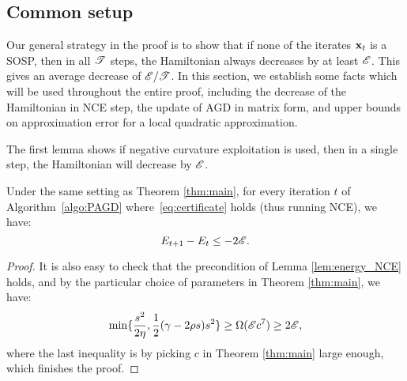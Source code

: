 





\subsection{Common setup}
Our general strategy in the proof is to show that if none of the iterates $\mathbf{x}_t$ is a SOSP, then in all $\mathscr{T}$ steps, the Hamiltonian always decreases by at least $\mathscr{E}$. This gives an average decrease of $\mathscr{E}/\mathscr{T}$. In this section, we establish some facts which will be used throughout the entire proof, including the decrease of the Hamiltonian in NCE step, the update of AGD in matrix form, and upper bounds on approximation error for a local quadratic approximation.

The first lemma shows if negative curvature exploitation is used, then in a single step, the Hamiltonian will decrease by $\mathscr{E}$.
\begin{lemma} \label{lem:NCE_decrease}
Under the same setting as Theorem \ref{thm:main}, for every iteration $t$ of Algorithm~\ref{algo:PAGD} where~\eqref{eq:certificate} holds (thus running NCE), we have:
\begin{equation*}
E_{t+1} - E_t\le  - 2\mathscr{E}.
\end{equation*}
\end{lemma}
\begin{proof}
It is also easy to check that the precondition of Lemma \ref{lem:energy_NCE} holds, and by the particular choice of parameters in Theorem \ref{thm:main}, we have:
\begin{equation*}
\min\{\frac{s^2}{2\eta},  \frac{1}{2}(\gamma - 2\rho s) s^2\} \ge \Omega(\mathscr{E} c^{7})\ge 2\mathscr{E},
\end{equation*}
where the last inequality is by picking $c$ in Theorem \ref{thm:main} large enough, which finishes the proof.
\end{proof}


